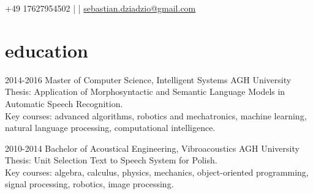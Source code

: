 \documentclass[]{friggeri-cv_osx}
\begin{document}

\begin{center}
+49 17627954502 \hspace{0.3cm} | \hspace{0.3cm}
\href{http:sebastiandziadzio.com}{\color{gray} \faHome} \href{https://github.com/sebastiandziadzio}{\color{gray} \faGithub} \href{https://twitter.com/sebadzia}{\color{gray} \faTwitter} \href{http://pl.linkedin.com/in/sebastiandziadzio}{\color{gray} \faLinkedin} \hspace{0.3cm} | \hspace{0.3cm}
\href{mailto:sebastian.dziadzio@gmail.com}{sebastian.dziadzio@gmail.com}
\end{center}
\vspace{0.5cm}

\section{education}
\begin{entrylist}
\entry
{2014-2016}
{Master of Computer Science, Intelligent Systems}
{AGH University}
{Thesis: Application of Morphosyntactic and Semantic Language Models in Automatic Speech Recognition.\\
Key courses: advanced algorithms, robotics and mechatronics, machine learning, natural language processing, computational intelligence.\\}

\entry
{2010-2014}
{Bachelor of Acoustical Engineering, Vibroacoustics}
{AGH University}
{Thesis: Unit Selection Text to Speech System for Polish.\\
Key courses: algebra, calculus, physics, mechanics, object-oriented programming, signal processing, robotics, image processing.\\}
\end{entrylist}
\end{document}
